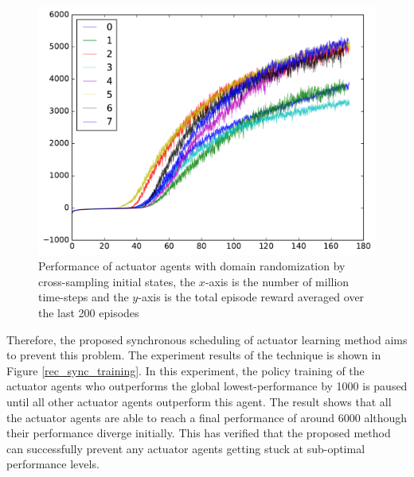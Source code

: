 \begin{figure}[!htbp]
	\includegraphics[width=\textwidth]{images/rec_8task_training.pdf}
	\centering
	\caption{Performance of actuator agents with domain randomization by cross-sampling initial states, the $x$-axis is the number of million time-steps and the $y$-axis is the total episode reward averaged over the last 200 episodes}\label{rec_8task_training}
\end{figure}

Therefore, the proposed synchronous scheduling of actuator learning method aims to prevent this problem. The experiment results of the technique is shown in Figure \ref{rec_sync_training}. In this experiment, the policy training of the actuator agents who outperforms the global lowest-performance by 1000 is paused until all other actuator agents outperform this agent. The result shows that all the actuator agents are able to reach a final performance of around 6000 although their performance diverge initially. This has verified that the proposed method can successfully prevent any actuator agents getting stuck at sub-optimal performance levels. 

